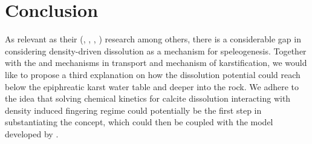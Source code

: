 \section{Conclusion}\label{sec:conclusionLiterature}
As relevant as their (\citet{Dreybrodt1996}, \citet{gabrovvsek2000role}, \citet{dreybrodt2004dissolution}, \citet{Dreybrodt2012}) research among others, there is a considerable gap in considering density-driven dissolution as a mechanism for speleogenesis. Together with the \citet{gabrovvsek2000role} and \citet{bogli1980physical} mechanisms in transport and mechanism of karstification, we would like to propose a third explanation on how the dissolution potential could reach below the epiphreatic karst water table and deeper into the rock. We adhere to the idea that solving chemical kinetics for calcite dissolution interacting with density induced fingering regime could potentially be the first step in substantiating the concept, which could then be coupled with the model developed by \citet{Class2020}.
\endinput